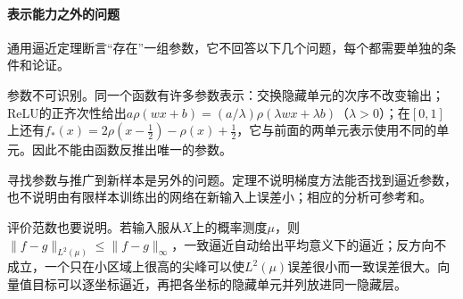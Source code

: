 \paragraph{表示能力之外的问题}

通用逼近定理断言“存在”一组参数，它不回答以下几个问题，每个都需要单独的条件和论证。

参数不可识别。同一个函数有许多参数表示：交换隐藏单元的次序不改变输出；ReLU的正齐次性给出$a\rho(wx+b)=(a/\lambda)\rho(\lambda wx+\lambda b)$（$\lambda>0$）；在$[0,1]$上还有$f_*(x)=2\rho(x-\frac12)-\rho(x)+\frac12$，它与前面的两单元表示使用不同的单元。因此不能由函数反推出唯一的参数。

寻找参数与推广到新样本是另外的问题。定理不说明梯度方法能否找到逼近参数，也不说明由有限样本训练出的网络在新输入上误差小；相应的分析可参考和。

评价范数也要说明。若输入服从$X$上的概率测度$\mu$，则$\|f-g\|_{L^2(\mu)}\le\|f-g\|_\infty$，一致逼近自动给出平均意义下的逼近；反方向不成立，一个只在小区域上很高的尖峰可以使$L^2(\mu)$误差很小而一致误差很大。向量值目标可以逐坐标逼近，再把各坐标的隐藏单元并列放进同一隐藏层。
